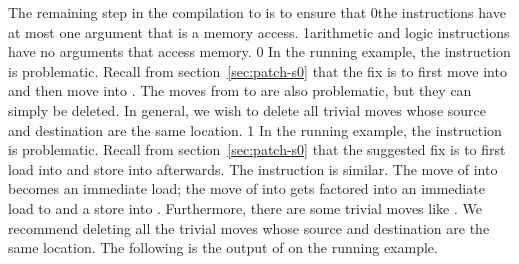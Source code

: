 \documentclass[7x10]{TimesAPriori_MIT}%
\def\xeightysixEd{0}
\def\riscvEd{1}
\def\architecture{1}
\newcommand\ifriscv[1]{\if\architecture\riscvEd{#1}\fi}
\newcommand\ifxeightsix[1]{\if\architecture\xeightysixEd{#1}\fi}
\numberwithin{theorem}{chapter}
\numberwithin{definition}{chapter}
\numberwithin{equation}{chapter}
\begin{document}
The remaining step in the compilation to {\ArchName} is to ensure that
\ifxeightsix{the instructions have at most one argument that is a
  memory access.}
\ifriscv{arithmetic and logic instructions have no arguments that
  access memory.}
%
\if\architecture\xeightysixEd
In the running example, the instruction  is problematic. Recall from section~\ref{sec:patch-s0}
  that the fix is to first move  into  and
  then move  into .
%
The moves from  to  are also
problematic, but they can simply be deleted. In general, we wish to
delete all trivial moves whose source and destination are the
same location.
\fi
\if\architecture\riscvEd
In the running example, the instruction
 is problematic. Recall from section~\ref{sec:patch-s0}
that the suggested fix is to first load  into
 and store  into  afterwards.
The instruction  is similar.
%
The move of  into  becomes an immediate load;
the move of  into  gets factored into an
immediate load to  and a store into .
Furthermore, there are some trivial moves like . We
recommend deleting all the trivial moves whose source and destination
are the same location.
\fi
%
The following is the output of  on the
running example.
\end{document}
